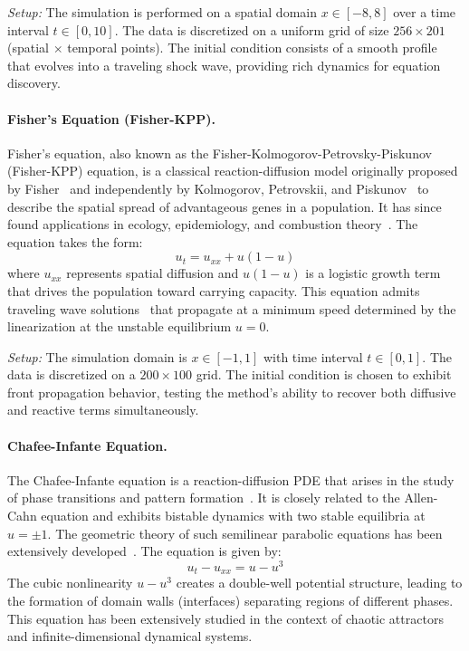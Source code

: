 \textit{Setup:} The simulation is performed on a spatial domain $x \in [-8, 8]$ over a time interval $t \in [0, 10]$. The data is discretized on a uniform grid of size $256 \times 201$ (spatial $\times$ temporal points). The initial condition consists of a smooth profile that evolves into a traveling shock wave, providing rich dynamics for equation discovery.

\paragraph{Fisher's Equation (Fisher-KPP).} 
Fisher's equation, also known as the Fisher-Kolmogorov-Petrovsky-Piskunov (Fisher-KPP) equation, is a classical reaction-diffusion model originally proposed by Fisher~\cite{fisher1937wave} and independently by Kolmogorov, Petrovskii, and Piskunov~\cite{kolmogorov1937study} to describe the spatial spread of advantageous genes in a population. It has since found applications in ecology, epidemiology, and combustion theory~\cite{murray1989mathematical}. The equation takes the form:
\begin{equation}
    u_t = u_{xx} + u(1-u)
\end{equation}
where $u_{xx}$ represents spatial diffusion and $u(1-u)$ is a logistic growth term that drives the population toward carrying capacity. This equation admits traveling wave solutions~\cite{ablowitz1979explicit} that propagate at a minimum speed determined by the linearization at the unstable equilibrium $u=0$.

\textit{Setup:} The simulation domain is $x \in [-1, 1]$ with time interval $t \in [0, 1]$. The data is discretized on a $200 \times 100$ grid. The initial condition is chosen to exhibit front propagation behavior, testing the method's ability to recover both diffusive and reactive terms simultaneously.

\paragraph{Chafee-Infante Equation.} 
The Chafee-Infante equation is a reaction-diffusion PDE that arises in the study of phase transitions and pattern formation~\cite{chafee1974bifurcation}. It is closely related to the Allen-Cahn equation and exhibits bistable dynamics with two stable equilibria at $u = \pm 1$. The geometric theory of such semilinear parabolic equations has been extensively developed~\cite{henry1981geometric}. The equation is given by:
\begin{equation}
    u_t - u_{xx} = u - u^3
\end{equation}
The cubic nonlinearity $u - u^3$ creates a double-well potential structure, leading to the formation of domain walls (interfaces) separating regions of different phases. This equation has been extensively studied in the context of chaotic attractors and infinite-dimensional dynamical systems.

